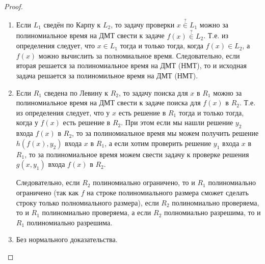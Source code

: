 \documentclass[12pt,a4paper]{article}
\newcommand{\Pclass}{\mathrm{P}}
\begin{document}
    \begin{proof}
        \begin{enumerate}
            \item Если $L_1$ сведён по Карпу к $L_2$, то задачу проверки $x \mathbin{\overset{?}{\in}} L_1$ можно за полиномиальное время на ДМТ свести к задаче $f(x) \mathbin{\overset{?}{\in}} L_2$. Т.е. из определения следует, что $x \in L_1$ тогда и только тогда, когда $f(x) \in L_2$, а $f(x)$ можно вычислить за полномиальное время. Следовательно, если вторая решается за полиномиальное время на ДМТ (НМТ), то и исходная задача решается за полиномильное время на ДМТ (НМТ).

            \item Если $R_1$ сведена по Левину к $R_2$, то задачу поиска для $x$ в $R_1$ можно за полиномиальное время на ДМТ свести к задаче поиска для $f(x)$ в $R_2$. Т.е. из определения следует, что у $x$ есть решение в $R_1$ тогда и только тогда, когда у $f(x)$ есть решение в $R_2$. При этом если мы нашли решение $y_2$ входа $f(x)$ в $R_2$, то за полиномиальное время мы можем получить решение $h(f(x), y_2)$ входа $x$ в $R_1$, а если хотим проверить решение $y_1$ входа $x$ в $R_1$, то за полиномиальное время можем свести задачу к проверке решения $g(x, y_1)$ входа $f(x)$ в $R_2$.
            
                Следовательно, если $R_2$ полиномиально ограничено, то и $R_1$ полиномиально ограничено (так как $f$ на строке полиномиального размера сможет сделать строку только полномиального размера), если $R_2$ полиномиально проверяема, то и $R_1$ полиномиально проверяема, а если $R_2$ полномиально разрешима, то и $R_1$ полиномиально разрешима.

            \item Без нормального доказательства.
            

        \end{enumerate}
    \end{proof}
\end{document}
